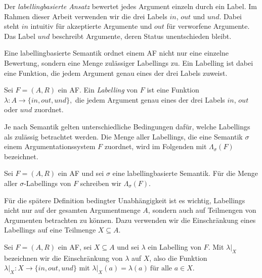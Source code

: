 Der \emph{labellingbasierte Ansatz} bewertet jedes Argument einzeln durch ein
Label. Im Rahmen dieser Arbeit verwenden wir die drei Labels
\(\mathit{in}\), \(\mathit{out}\) und \(\mathit{und}\). Dabei steht
\(\mathit{in}\) intuitiv für akzeptierte Argumente und \(\mathit{out}\) für
verworfene Argumente. Das Label \(\mathit{und}\) beschreibt Argumente, deren
Status unentschieden bleibt.

Eine labellingbasierte Semantik ordnet einem AF nicht nur eine einzelne
Bewertung, sondern eine Menge zulässiger Labellings zu. Ein Labelling ist dabei
eine Funktion, die jedem Argument genau eines der drei Labels zuweist.
\begin{Definition}
      \label{def:labelling}
      Sei \(F=(A,R)\) ein AF. Ein \emph{Labelling} von \(F\) ist eine Funktion
      \(\lambda : A \to \{\mathit{in},\mathit{out},\mathit{und}\},\)
      die jedem Argument genau eines der drei Labels
      \(\mathit{in}\), \(\mathit{out}\) oder \(\mathit{und}\) zuordnet.
\end{Definition}

Je nach Semantik gelten unterschiedliche Bedingungen dafür, welche Labellings
als zulässig betrachtet werden. Die Menge aller Labellings, die eine Semantik
\(\sigma\) einem Argumentationssystem \(F\) zuordnet, wird im Folgenden mit
\(\Lambda_\sigma(F)\) bezeichnet.
\begin{Definition}
      \label{def:labelling-set-of-all}
      Sei \(F=(A,R)\) ein AF und sei \(\sigma\) eine labellingbasierte
      Semantik. Für die Menge aller \(\sigma\)-Labellings von \(F\) schreiben
      wir \(\Lambda_\sigma(F).\)
\end{Definition}

Für die spätere Definition bedingter Unabhängigkeit ist es wichtig, Labellings
nicht nur auf der gesamten Argumentmenge \(A\), sondern auch auf Teilmengen von
Argumenten betrachten zu können. Dazu verwenden wir die Einschränkung eines
Labellings auf eine Teilmenge \(X\subseteq A\).
\begin{Definition}
      \label{def:labelling-rest}
      Sei \(F=(A,R)\) ein AF, sei \(X\subseteq A\) und sei \(\lambda\) ein
      Labelling von \(F\). Mit \(\lambda|_X\) bezeichnen wir die Einschränkung
      von \(\lambda\) auf \(X\), also die Funktion \(\lambda|_X : X \to \{\mathit{in},\mathit{out},\mathit{und}\}\)
      mit \(\lambda|_X(a)=\lambda(a)~ \text{für alle } a\in X.\)

\end{Definition}


